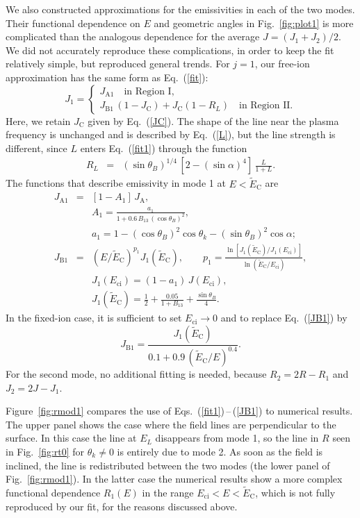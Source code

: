\documentclass{aa}
\newcommand{\beq}{\begin{equation}}
\newcommand{\eeq}{\end{equation}}
\newcommand{\bea}{\begin{eqnarray}}
\newcommand{\eea}{\end{eqnarray}}
\newcommand{\req}[1]{Eq.~(\ref{#1})}
\newcommand{\Eci}{E_\mathrm{ci}}
\newcommand{\tEC}{\tilde{E}_\mathrm{C}}
\begin{document}
We also constructed approximations for the
emissivities in each of the two modes. Their functional
dependence on $E$ and geometric angles in Fig.~\ref{fig:plot1}
is more complicated than the analogous dependence for the average
$J=(J_1+J_2)/2$. We did not accurately reproduce these
complications, in order to keep the fit relatively simple,
but reproduced general trends. For $j=1$, our free-ion
approximation has the same form as \req{fit}:
\beq
   J_1 = \left\{ \begin{array}{l}
   J_\mathrm{A1}
    \quad\textrm{in Region~I},
    \\
    J_\mathrm{B1}\,(1-J_\mathrm{C})    
     + J_\mathrm{C} (1 - R_L)
    \quad\textrm{in Region~II}.
    \end{array} \right.
\label{fit1}
\eeq
Here, we retain $J_\mathrm{C}$ given by \req{JC}. 
The shape of the line near the plasma
frequency is unchanged and is described by \req{L},
but the line strength
is different, since $L$ enters
\req{fit1} through the function
\bea
      R_L &=& 
      (\sin\theta_B)^{1/4}\,\left[2-(\sin\alpha)^4 \right]
      \,\frac{{L}}{1+{L}} .
\eea
The  functions that describe emissivity in mode 1 at $E <
\tEC$ are
\bea
   J_\mathrm{A1} &=& [ 1 - A_1 ] \, J_\mathrm{A},
\\&&
   A_1 = \frac{a_1}{1+0.6\,B_{13}\,(\cos\theta_B)^2},
\nonumber\\&&
   a_1 = 1-(\cos\theta_B)^2\cos\theta_k-(\sin\theta_B)^2\cos\alpha;
\nonumber\\
   J_\mathrm{B1} &=& (E/\tEC)^{p_1} J_1(\tEC),
\qquad
   p_1=\frac{\ln[J_1(\tEC)/J_1(\Eci)]}{\ln(\tEC/\Eci)},
\label{JB1}\\&&
   J_1(\Eci) = (1-a_1)\,J(\Eci),
\nonumber\\&&
   J_1(\tEC) = \frac12 +
   \frac{0.05}{1+B_{13}}+\frac{\sin\theta_B}{4}.
\nonumber
\eea
In the fixed-ion case, it is sufficient to set $\Eci\to0$
and to replace \req{JB1} by
\beq
    J_\mathrm{B1} = \frac{J_1(\tEC)
       }{
          0.1+0.9\,(\tEC/E)^{0.4}} .
\eeq
For the second mode, no additional fitting is needed,
because 
$R_2=2R-R_1$ and $J_2=2J-J_1$.

Figure~\ref{fig:rmod1} compares the use of
Eqs.~(\ref{fit1})\,--\,(\ref{JB1})
to numerical results. The upper
panel shows the case where the field lines are perpendicular to
the surface. In this case the line at $E_L$ disappears from 
mode 1, so the line in $R$ seen in Fig.~\ref{fig:rt0} for
$\theta_k\neq0$ is entirely due to mode 2. As soon as the field
is inclined, the line is redistributed between the two modes (the
lower panel of Fig.~\ref{fig:rmod1}). In the latter case the
numerical results show a more complex functional
dependence $R_1(E)$ in the range $\Eci<E<\tEC$, which is not
fully reproduced by our fit, for the reasons 
discussed above.
\end{document}
